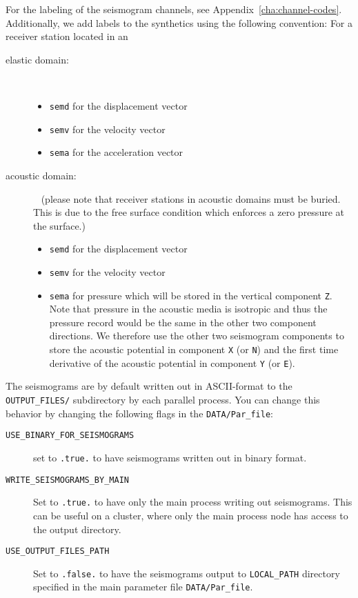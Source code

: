 For the labeling of the seismogram channels, see Appendix~\ref{cha:channel-codes}.
Additionally, we add labels to the synthetics using the following
convention: For a receiver station located in an
\begin{description}
\item [{elastic domain:}] ~
\begin{itemize}
\item \texttt{semd} for the displacement vector
\item \texttt{semv} for the velocity vector
\item \texttt{sema} for the acceleration vector
\end{itemize}
\item [{acoustic domain:}] ~\newline
 (please note that receiver stations in acoustic domains must be buried.
This is due to the free surface condition which enforces a zero pressure
at the surface.)
\begin{itemize}
\item \texttt{semd} for the displacement vector
\item \texttt{semv} for the velocity vector
\item \texttt{sema} for pressure which will be stored in the vertical component
\texttt{Z}. Note that pressure in the acoustic media is isotropic
and thus the pressure record would be the same in the other two component
directions. We therefore use the other two seismogram components to
store the acoustic potential in component \texttt{X} (or \texttt{N})
and the first time derivative of the acoustic potential in component
\texttt{Y} (or \texttt{E}).
\end{itemize}
\end{description}
The seismograms are by default written out in ASCII-format to the
\texttt{OUTPUT\_FILES/} subdirectory by each parallel process. You
can change this behavior by changing the following flags in the \texttt{DATA/Par\_file}:
\begin{description}
\item [{\texttt{USE\_BINARY\_FOR\_SEISMOGRAMS}}] set to \texttt{.true.} to have seismograms
written out in binary format.
\item [{\texttt{WRITE\_SEISMOGRAMS\_BY\_MAIN}}] Set to \texttt{.true.}
to have only the main process writing out seismograms. This can
be useful on a cluster, where only the main process node has access
to the output directory.
\item [{\texttt{USE\_OUTPUT\_FILES\_PATH}}] Set to \texttt{.false.} to
have the seismograms output to \texttt{LOCAL\_PATH} directory specified
in the main parameter file \texttt{DATA/Par\_file}.
\end{description}


